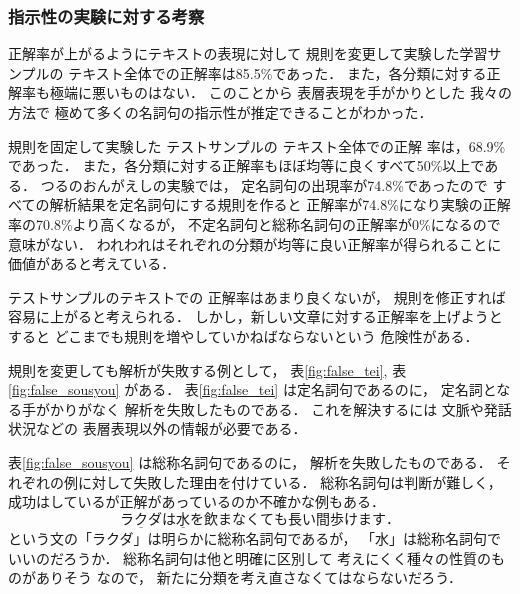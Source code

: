 \subsubsection{指示性の実験に対する考察}

正解率が上がるようにテキストの表現に対して
規則を変更して実験した学習サンプルの
テキスト全体での正解率は85.5\%であった．
また，各分類に対する正解率も極端に悪いものはない．
このことから
表層表現を手がかりとした
我々の方法で
極めて多くの名詞句の指示性が推定できることがわかった．

規則を固定して実験した
テストサンプルの
テキスト全体での正解
率は，68.9\%であった．
また，各分類に対する正解率もほぼ均等に良くすべて50\%以上である．
つるのおんがえしの実験では，
定名詞句の出現率が74.8\%であったので
すべての解析結果を定名詞句にする規則を作ると
正解率が74.8\%になり実験の正解率の70.8\%より高くなるが，
不定名詞句と総称名詞句の正解率が0\%になるので意味がない．
われわれはそれぞれの分類が均等に良い正解率が得られることに
価値があると考えている．

テストサンプルのテキストでの
正解率はあまり良くないが，
規則を修正すれば容易に上がると考えられる．
しかし，新しい文章に対する正解率を上げようとすると
どこまでも規則を増やしていかねばならないという
危険性がある．


規則を変更しても解析が失敗する例として，
表\ref{fig:false_tei},
表\ref{fig:false_sousyou}
がある．
表\ref{fig:false_tei} は定名詞句であるのに，
定名詞となる手がかりがなく
解析を失敗したものである．
これを解決するには
文脈や発話状況などの
表層表現以外の情報が必要である．

表\ref{fig:false_sousyou} は総称名詞句であるのに，
解析を失敗したものである．
それぞれの例に対して失敗した理由を付けている．
総称名詞句は判断が難しく，
成功はしているが正解があっているのか不確かな例もある．
\begin{equation}
\underline{ラクダ}は\underline{水}を飲まなくても長い間歩けます．
  \label{eqn:rakuda}
\end{equation}
\vspace*{-.3mm}
という文の「ラクダ」は明らかに総称名詞句であるが，
「水」は総称名詞句でいいのだろうか．
総称名詞句は他と明確に区別して
考えにくく種々の性質のものがありそう
なので，
新たに分類を考え直さなくてはならないだろう．



\setcounter{bottomnumber}{2}

